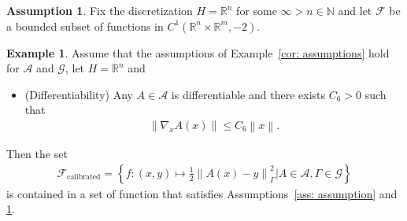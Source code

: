 \documentclass{amsart}
\theoremstyle{definition}
\newtheorem{assumption}{Assumption}
\newtheorem{example}[theorem]{Example}
\newcommand{\R}{{\mathbb R}}
\newcommand{\norm}[1]{\left\|#1\right\|}
\newcommand{\Natural}{\mathbb{N}}
\newcommand{\F}{\mathcal{F}}
\begin{document}
\begin{assumption}\label{ass: finite dimension}
    Fix the discretization $H = \R^n$ for some $\infty > n \in \Natural$ and let $\F$ be a bounded subset of functions in $C^1(\R^n \times \R^m, -2)$.
\end{assumption}


\begin{example}
Assume that the assumptions of Example~\ref{cor: assumptions} hold for $\mathcal{A}$ and $\mathcal{G}$, let $H = \R^n$ and
\begin{itemize}
    \item[(B4)] (Differentiability) Any $A\in \mathcal{A}$ is differentiable and there exists $C_6>0$ such that
        \begin{eqnarray*}
            \norm{\nabla_x A(x)} \le C_6 \norm{x}.
        \end{eqnarray*}
\end{itemize}
Then the set 
    \begin{eqnarray*}
        \F_{\text{calibrated}} =\left\{f: (x, y) \mapsto \frac{1}{2} \norm{A(x) -y }_\Gamma^2 \bigg| A \in \mathcal{A}, \Gamma \in \mathcal{G}\right\}
    \end{eqnarray*}
    is contained in a set of function that satisfies Assumptions~\ref{ass: assumption} and \ref{ass: finite dimension}.
\end{example}
\end{document}
